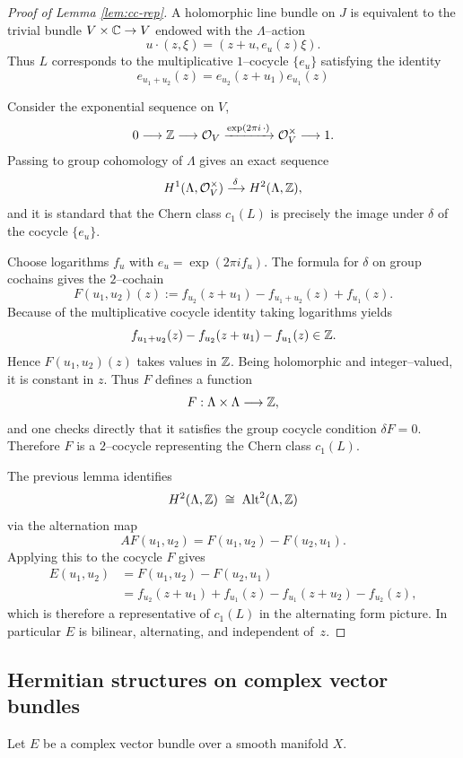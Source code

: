 \documentclass[12pt]{article}
\begin{document}
\begin{solution}
\begin{proof}
[Proof of Lemma \ref{lem:cc-rep}]
A holomorphic line bundle on $J$ is equivalent to the trivial bundle
$V\times\mathbb{C}\to V$ endowed with the $\Lambda$--action
\[
u\cdot(z,\xi)=(z+u, e_u(z)\xi).
\]
Thus $L$ corresponds to the multiplicative $1$--cocycle $\{e_u\}$
satisfying the identity \[e_{u_1+u_2}(z)=e_{u_2}(z+u_1)e_{u_1}(z)\]

Consider the exponential sequence on $V$,
\[
0 \longrightarrow \mathbb{Z}
  \longrightarrow {\mathcal{O}}_V
  \xrightarrow{\exp(2\pi i\,\cdot)} {\mathcal{O}}_V^\times
  \longrightarrow 1.
\]
Passing to group cohomology of $\Lambda$ gives an exact sequence
\[
H^1(\Lambda,{\mathcal{O}}^\times_V)
  \xrightarrow{\;\delta\;}
H^2(\Lambda,\mathbb{Z}),
\]
and it is standard that the Chern class $c_1(L)$ is precisely the
image under $\delta$ of the cocycle $\{e_u\}$.

Choose logarithms $f_u$ with $e_u=\exp(2\pi i f_u)$.  The formula for
$\delta$ on group cochains gives the $2$--cochain
\[
F(u_1,u_2)(z)
  := f_{u_2}(z+u_1)-f_{u_1+u_2}(z)+f_{u_1}(z).
\]
Because of the multiplicative cocycle identity taking
logarithms yields
\[
f_{u_1+u_2}(z)
  - f_{u_2}(z+u_1)
  - f_{u_1}(z)
  \in \mathbb{Z}.
\]
Hence $F(u_1,u_2)(z)$ takes values in $\mathbb{Z}$.  Being holomorphic and
integer--valued, it is constant in $z$.  Thus $F$ defines a function
\[
F:\Lambda\times\Lambda\longrightarrow\mathbb{Z},
\]
and one checks directly that it satisfies the group cocycle condition
$\delta F=0$.  Therefore $F$ is a $2$--cocycle representing the Chern
class $c_1(L)$.

The previous lemma identifies
\[
H^2(\Lambda,\mathbb{Z})\;\cong\;\operatorname{Alt}^2(\Lambda,\mathbb{Z})
\]
via the alternation map
\[
AF(u_1,u_2)=F(u_1,u_2)-F(u_2,u_1).
\]
Applying this to the cocycle $F$ gives
\[
\begin{aligned}
E(u_1,u_2)
 &= F(u_1,u_2)-F(u_2,u_1) \\
 &= f_{u_2}(z+u_1)+f_{u_1}(z)
    -f_{u_1}(z+u_2)-f_{u_2}(z),
\end{aligned}
\]
which is therefore a representative of $c_1(L)$ in the alternating
form picture.  In particular $E$ is bilinear, alternating, and
independent of~$z$.
\end{proof}
\end{solution}

\subsection{Hermitian structures on complex vector bundles}
Let $E$ be a complex vector bundle over a smooth manifold $X$. 
\end{document}
